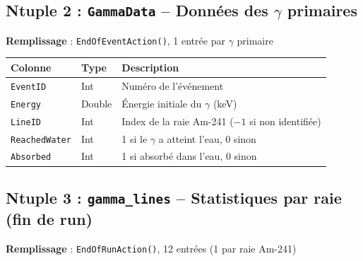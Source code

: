 \documentclass[11pt,a4paper]{article}
\newcommand{\code}[1]{\texttt{#1}}
\begin{document}
\subsection{Ntuple 2 : \code{GammaData} -- Données des $\gamma$ primaires}

\textbf{Remplissage} : \code{EndOfEventAction()}, 1 entrée par $\gamma$ primaire

\begin{table}[h]
\centering
\begin{tabular}{p{3.5cm} p{2cm} p{8cm}}
    \toprule
    \rowcolor{headerblue!20}
    \textbf{Colonne} & \textbf{Type} & \textbf{Description} \\
    \midrule
    \code{EventID} & Int & Numéro de l'événement \\
    \rowcolor{lightgray}
    \code{Energy} & Double & Énergie initiale du $\gamma$ (keV) \\
    \code{LineID} & Int & Index de la raie Am-241 ($-1$ si non identifiée) \\
    \rowcolor{lightgray}
    \code{ReachedWater} & Int & 1 si le $\gamma$ a atteint l'eau, 0 sinon \\
    \code{Absorbed} & Int & 1 si absorbé dans l'eau, 0 sinon \\
    \bottomrule
\end{tabular}
\end{table}

\subsection{Ntuple 3 : \code{gamma\_lines} -- Statistiques par raie (fin de run)}

\textbf{Remplissage} : \code{EndOfRunAction()}, 12 entrées (1 par raie Am-241)
\end{document}
